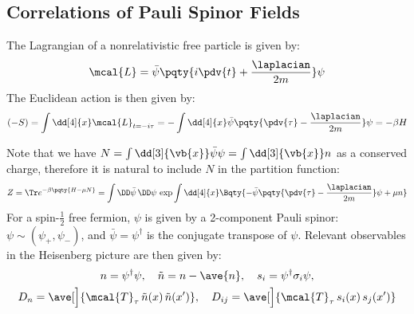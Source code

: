 \documentclass[a4paper,10pt]{article}
\begin{document}
\maketitle
\pagestyle{headings}
\thispagestyle{empty}

\vspace*{-1.5\baselineskip}

\subsection*{Correlations of Pauli Spinor Fields}
	The Lagrangian of a nonrelativistic free particle is given by:
	\begin{equation}
		\mcal{L}
		= \bar{\psi} \pqty{
				i\pdv{t} + \frac{\laplacian}{2m}
			} \psi
	\end{equation}
	The Euclidean action is then given by:
	\begin{equation}
		(-S) = \int \dd[4]{x}
			\mcal{L}_{t = -i\tau}
		= -\int \dd[4]{x}
			\bar{\psi} \pqty{
				\pdv{\tau} - \frac{\laplacian}{2m}
			} \psi
		= -\beta H
	\end{equation}
	
	Note that we have $
		N = \int \dd[3]{\vb{x}} \bar{\psi} \psi
		= \int \dd[3]{\vb{x}} n
	$ as a conserved charge, therefore it is natural to include $N$ in the partition function:
	\begin{equation}
		Z = \Tr e^{-\beta \pqty{H - \mu N}}
		= \int \DD\bar{\psi}\, \DD\psi\,
			\exp \int \dd[4]{x}
				\Bqty{
					- \bar{\psi} \pqty{
						\pdv{\tau} - \frac{\laplacian}{2m}
					} \psi
					+ \mu n
				}
	\end{equation}
	For a spin-$\frac{1}{2}$ free fermion, $\psi$ is given by a 2-component Pauli spinor: $
		\psi \sim (\psi_+, \psi_-)
	$, and $\bar{\psi} = \psi^\dagger$ is the conjugate transpose of $\psi$. Relevant observables in the Heisenberg picture are then given by:
	\begin{gather}
		n = \psi^\dagger \psi,\quad
		\tilde{n} = n - \ave{n},\quad
		s_i = \psi^\dagger \sigma_i \psi,
	\\
		D_n = \ave[\Big]{
				\mcal{T}_\tau\,
					\tilde{n}(x)\,
					\tilde{n}(x')
			},\quad
		D_{ij} = \ave[\Big]{
				\mcal{T}_\tau\,
					s_i(x)\,
					s_j(x')
			}
	\end{gather}
	
\end{document}
